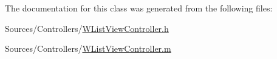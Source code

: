 The documentation for this class was generated from the following files\-:\begin{DoxyCompactItemize}
\item 
Sources/\-Controllers/\hyperlink{_w_list_view_controller_8h}{W\-List\-View\-Controller.\-h}\item 
Sources/\-Controllers/\hyperlink{_w_list_view_controller_8m}{W\-List\-View\-Controller.\-m}\end{DoxyCompactItemize}
